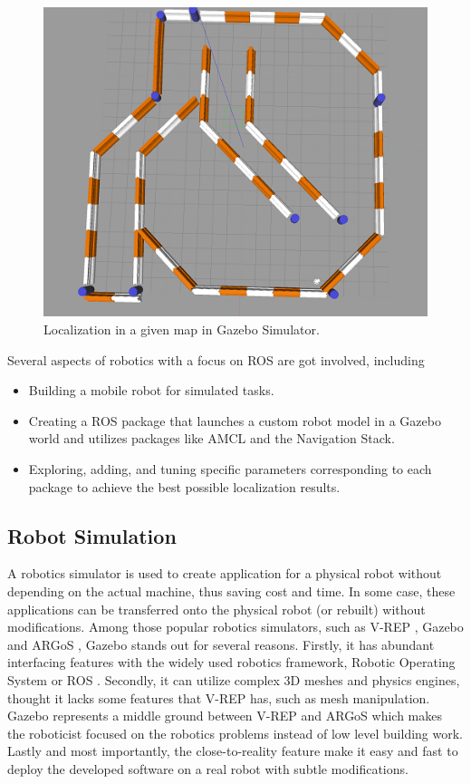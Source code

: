 \documentclass[10pt,journal,compsoc]{IEEEtran}
\begin{document}
\begin{figure}[thpb]
      \centering
      \includegraphics[width=\linewidth]{images/intro-image.png}
      \caption{Localization in a given map in Gazebo Simulator.}
      \label{fig:intro}
\end{figure}

Several aspects of robotics with a focus on ROS are got involved, including

\begin{itemize}
\item Building a mobile robot for simulated tasks.
\item Creating a ROS package that launches a custom robot model in a Gazebo world and utilizes packages like AMCL and the Navigation Stack.
\item Exploring, adding, and tuning specific parameters corresponding to each package to achieve the best possible localization results.
\end {itemize}

\subsection{Robot Simulation}
A robotics simulator is used to create application for a physical robot without depending on the actual machine, thus saving cost and time. In some case, these applications can be transferred onto the physical robot (or rebuilt) without modifications. Among those popular robotics simulators, such as V-REP \cite{vrep}, Gazebo \cite{gazebo} and ARGoS \cite{argos}, Gazebo stands out for several reasons. Firstly, it has abundant interfacing features with the widely used robotics framework, Robotic Operating System or ROS \cite{ros}. Secondly, it can utilize complex 3D meshes and physics engines, thought it lacks some features that V-REP has, such as mesh manipulation. Gazebo represents a middle ground between V-REP and ARGoS which makes the roboticist focused on the robotics problems instead of low level building work. Lastly and most importantly, the close-to-reality feature make it easy and fast to deploy the developed software on a real robot with subtle modifications.
\end{document}
